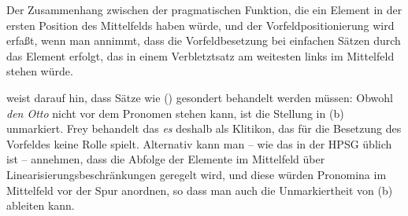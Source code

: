 Der Zusammenhang zwischen der pragmatischen Funktion, die ein Element in der ersten Position des Mittelfelds
haben würde, und der Vorfeldpositionierung wird erfaßt, wenn man annimmt, 
dass die Vorfeldbesetzung bei einfachen Sätzen durch das Element erfolgt,
das in einem Verbletztsatz am weitesten links im Mittelfeld stehen würde.

\citet{Frey2004a} weist darauf hin, dass Sätze wie () gesondert behandelt werden müssen:
\eal
{}
\zl
Obwohl \emph{den Otto} nicht vor dem Pronomen stehen kann, ist die Stellung in (b) unmarkiert.
Frey behandelt das \emph{es} deshalb als Klitikon, das für die Besetzung des Vorfeldes keine Rolle
spielt. Alternativ kann man -- wie das in der HPSG üblich ist -- annehmen, dass die Abfolge der Elemente
im Mittelfeld über Linearisierungsbeschränkungen geregelt wird, und diese würden Pronomina im Mittelfeld
vor der Spur anordnen, so dass man auch die Unmarkiertheit von (b) ableiten kann.%
%
%




